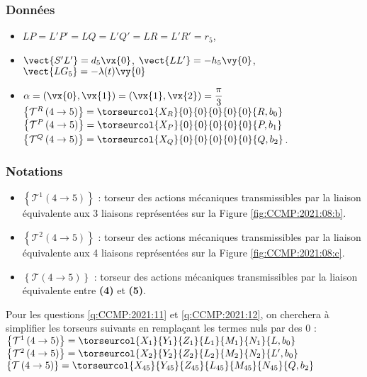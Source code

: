 \subsubsection*{Données}
\begin{itemize}
\item $LP=L'P' = LQ  = L'Q' = LR = L'R' = r_5$,
\item $\vect{S'L'} = d_5 \vx{0}$, $\vect{LL'} = -h_5 \vy{0}$, $\vect{LG_5}=-\lambda(t) \vy{0}$
\item $\alpha  =(\vx{0},\vx{1})=(\vx{1},\vx{2})=\dfrac{\pi}{3}$
$\left\{ \mathcal{T}^R \left(4\to 5 \right) \right\} = \torseurcol{X_R}{0}{0}{0}{0}{0}{R,b_0}$
$\left\{ \mathcal{T}^P \left(4\to 5 \right) \right\} = \torseurcol{X_P}{0}{0}{0}{0}{0}{P,b_1}$
$\left\{ \mathcal{T}^Q \left(4\to 5 \right) \right\} = \torseurcol{X_Q}{0}{0}{0}{0}{0}{Q,b_2}$.
\end{itemize}
\subsubsection*{Notations}
\begin{itemize}
    \item $\left\{ \mathcal{T}^1 \left(4\to 5 \right) \right\}$ : torseur des actions mécaniques transmissibles par la liaison équivalente aux 3 liaisons représentées sur la Figure \ref{fig:CCMP:2021:08:b}.
    \item $\left\{ \mathcal{T}^2 \left(4\to 5 \right) \right\}$ : torseur des actions mécaniques transmissibles par la liaison équivalente aux 4 liaisons représentées sur la Figure \ref{fig:CCMP:2021:08:c}.
    \item $\left\{ \mathcal{T} \left(4\to 5 \right) \right\}$ : torseur des actions mécaniques transmissibles par la liaison équivalente entre \textbf{(4)} et \textbf{(5)}.
\end{itemize}
Pour les questions \ref{q:CCMP:2021:11} et \ref{q:CCMP:2021:12}, on cherchera à simplifier les torseurs suivants en remplaçant les termes nuls par des 0 :
$\left\{ \mathcal{T}^1 \left(4\to 5 \right) \right\} = \torseurcol{X_1}{Y_1}{Z_1}{L_1}{M_1}{N_1}{L,b_0}$
$\left\{ \mathcal{T}^2 \left(4\to 5 \right) \right\} = \torseurcol{X_2}{Y_2}{Z_2}{L_2}{M_2}{N_2}{L',b_0}$
$\left\{ \mathcal{T} \left(4\to 5 \right) \right\} = \torseurcol{X_{45}}{Y_{45}}{Z_{45}}{L_{45}}{M_{45}}{N_{45}}{Q,b_2}$ 

\ifprof
\begin{corrige}
\end{corrige}
\else
\fi

